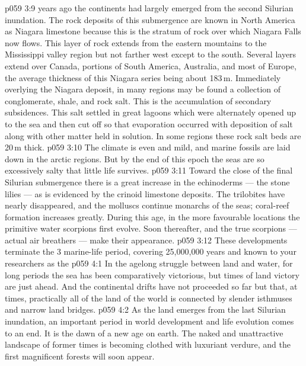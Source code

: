 \vs p059 3:9 \pc {} years ago the continents had largely emerged from the second Silurian inundation. The rock deposits of this submergence are known in North America as Niagara limestone because this is the stratum of rock over which Niagara Falls now flows. This layer of rock extends from the eastern mountains to the Mississippi valley region but not farther west except to the south. Several layers extend over Canada, portions of South America, Australia, and most of Europe, the average thickness of this Niagara series being about 183\,m. Immediately overlying the Niagara deposit, in many regions may be found a collection of conglomerate, shale, and rock salt. This is the accumulation of secondary subsidences. This salt settled in great lagoons which were alternately opened up to the sea and then cut off so that evaporation occurred with deposition of salt along with other matter held in solution. In some regions these rock salt beds are 20\,m thick.
\vs p059 3:10 The climate is even and mild, and marine fossils are laid down in the arctic regions. But by the end of this epoch the seas are so excessively salty that little life survives.
\vs p059 3:11 Toward the close of the final Silurian submergence there is a great increase in the echinoderms --- the stone lilies --- as is evidenced by the crinoid limestone deposits. The trilobites have nearly disappeared, and the molluscs continue monarchs of the seas; coral\hyp{}reef formation increases greatly. During this age, in the more favourable locations the primitive water scorpions first evolve. Soon thereafter, and  the true scorpions --- actual air breathers --- make their appearance.
\vs p059 3:12 These developments terminate the 3 marine\hyp{}life period, covering 25,000,000 years and known to your researchers as the 
\vs p059 4:1 In the agelong struggle between land and water, for long periods the sea has been comparatively victorious, but times of land victory are just ahead. And the continental drifts have not proceeded so far but that, at times, practically all of the land of the world is connected by slender isthmuses and narrow land bridges.
\vs p059 4:2 As the land emerges from the last Silurian inundation, an important period in world development and life evolution comes to an end. It is the dawn of a new age on earth. The naked and unattractive landscape of former times is becoming clothed with luxuriant verdure, and the first magnificent forests will soon appear.
